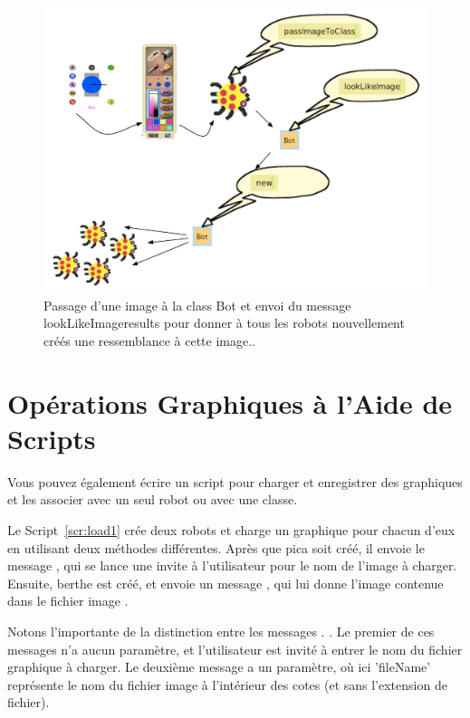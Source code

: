 \documentclass[a4paper,10pt,twoside]{book}
\begin{document}
\begin{figure}[h]
\begin{center}
\includegraphics[width=\textwidth]{allGraphics2}
\end{center}
\caption{Passage d'une image \`a la class Bot et envoi du message lookLikeImageresults 
pour donner \`a tous les robots nouvellement cr\'e\'es une ressemblance \`a cette image.. \label{fig:allGraphics}}
\end{figure}

\section{Op\'erations Graphiques \`a l'Aide de Scripts}

Vous pouvez \'egalement \'ecrire un script pour charger et enregistrer des graphiques et les 
associer avec un seul robot ou avec une classe. 

Le Script~\ref{scr:load1} cr\'ee deux robots et charge un graphique pour chacun d'eux en utilisant 
deux m\'ethodes diff\'erentes. Apr\`es que pica soit cr\'e\'e, il envoie le message , qui se 
lance une invite \`a l'utilisateur pour le nom de l'image \`a charger. Ensuite, berthe est cr\'e\'e, et 
envoie un message , qui lui donne l'image contenue dans le fichier image . 

Notons l'importante de la distinction entre les messages . 
. Le premier de ces messages n'a aucun param\`etre, et l'utilisateur est invit\'e \`a entrer le nom du 
fichier graphique \`a charger. Le deuxi\`eme message a un param\`etre, où ici 'fileName'  repr\'esente le 
nom du fichier image \`a l'int\'erieur des cotes (et sans l'extension de fichier).
\end{document}
